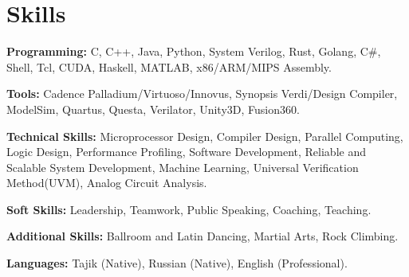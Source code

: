 \documentclass[letterpaper,11pt]{article}
\newcommand{\resumeSubHeadingListStart}{\begin{itemize}[leftmargin=0.15in, label={}]}
\newcommand{\resumeSubHeadingListEnd}{\end{itemize}}
\begin{document}
        
        




\section{Skills}
  \vspace{2pt}
  \resumeSubHeadingListStart
    \small{\item{
        \textcolor{secondary_color}{\textbf{Programming:}}{ C, C++, Java, Python, System Verilog, Rust, Golang, C\#, Shell, Tcl, CUDA, Haskell, MATLAB, x86/ARM/MIPS Assembly.} \\ \vspace{3pt}
        
        \textcolor{secondary_color}{\textbf{Tools:}}{ Cadence Palladium/Virtuoso/Innovus, Synopsis Verdi/Design Compiler, ModelSim, Quartus, Questa, Verilator, Unity3D, Fusion360.} \\ \vspace{3pt}

        \textcolor{secondary_color}{\textbf{Technical Skills:}}{ Microprocessor Design, Compiler Design, Parallel Computing, Logic Design, Performance Profiling, Software Development, Reliable and Scalable System Development, Machine Learning, Universal Verification Method(UVM), Analog Circuit Analysis.} \\ \vspace{3pt}
        
        \textcolor{secondary_color}{\textbf{Soft Skills:}}{ Leadership, Teamwork, Public Speaking, Coaching, Teaching.} \\ \vspace{3pt}
        
        \textcolor{secondary_color}{\textbf{Additional Skills:}}{ Ballroom and Latin Dancing, Martial Arts, Rock Climbing.} \\ \vspace{3pt}

        \textcolor{secondary_color}{\textbf{Languages:}}{ Tajik (Native), Russian (Native), English (Professional).}
        
    }}
  \resumeSubHeadingListEnd
\end{document}
